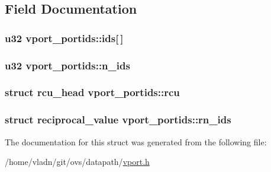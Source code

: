 \subsection{Field Documentation}
\hypertarget{structvport__portids_aa8570053786f982366b3dfb513479628}{}
\subsubsection[{ids}]{\setlength{\rightskip}{0pt plus 5cm}u32 vport\+\_\+portids\+::ids\mbox{[}$\,$\mbox{]}}\label{structvport__portids_aa8570053786f982366b3dfb513479628}
\hypertarget{structvport__portids_ac76f512a0f0dbe3468b006e66bddc420}{}
\subsubsection[{n\+\_\+ids}]{\setlength{\rightskip}{0pt plus 5cm}u32 vport\+\_\+portids\+::n\+\_\+ids}\label{structvport__portids_ac76f512a0f0dbe3468b006e66bddc420}
\hypertarget{structvport__portids_ab5cbafb043788d6b07ed054824f6167c}{}
\subsubsection[{rcu}]{\setlength{\rightskip}{0pt plus 5cm}struct rcu\+\_\+head vport\+\_\+portids\+::rcu}\label{structvport__portids_ab5cbafb043788d6b07ed054824f6167c}
\hypertarget{structvport__portids_a9828dc460e2dd5ef92f6c4a1eba6bc3b}{}
\subsubsection[{rn\+\_\+ids}]{\setlength{\rightskip}{0pt plus 5cm}struct {\bf reciprocal\+\_\+value} vport\+\_\+portids\+::rn\+\_\+ids}\label{structvport__portids_a9828dc460e2dd5ef92f6c4a1eba6bc3b}


The documentation for this struct was generated from the following file\+:\begin{DoxyCompactItemize}
\item 
/home/vladn/git/ovs/datapath/\hyperlink{vport_8h}{vport.\+h}\end{DoxyCompactItemize}
